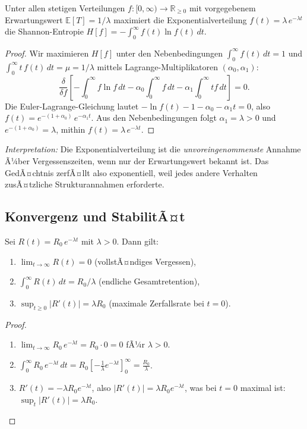 ﻿\documentclass[12pt,a4paper,twoside]{article}
\theoremstyle{theormstyle}
\theoremstyle{proofstyle}
\begin{document}
		Unter allen stetigen Verteilungen $f : [0,\infty) \to \mathbb{R}_{\geq 0}$
		mit vorgegebenem Erwartungswert $\mathbb{E}[T] = 1/\lambda$ maximiert die
		Exponentialverteilung
		$f(t) = \lambda\,e^{-\lambda t}$
		die Shannon-Entropie
		$H[f] = -\int_0^\infty f(t)\ln f(t)\,dt$.
	
	\begin{proof}
		Wir maximieren $H[f]$ unter den Nebenbedingungen
		$\int_0^\infty f(t)\,dt = 1$ und $\int_0^\infty t\,f(t)\,dt = \mu = 1/\lambda$
		mittels Lagrange-Multiplikatoren $(\alpha_0, \alpha_1)$:
		\[
		\frac{\delta}{\delta f}\!\left[
		-\!\int_0^\infty f\ln f\,dt
		- \alpha_0\!\int_0^\infty f\,dt
		- \alpha_1\!\int_0^\infty t f\,dt
		\right] = 0.
		\]
		Die Euler-Lagrange-Gleichung lautet
		$-\ln f(t) - 1 - \alpha_0 - \alpha_1 t = 0$, also
		$f(t) = e^{-(1+\alpha_0)}\,e^{-\alpha_1 t}$.
		Aus den Nebenbedingungen folgt $\alpha_1 = \lambda > 0$ und
		$e^{-(1+\alpha_0)} = \lambda$, mithin $f(t) = \lambda\,e^{-\lambda t}$.
	\end{proof}
	
	\textit{Interpretation:} Die Exponentialverteilung ist die \emph{unvoreingenommenste}
	Annahme Ã¼ber Vergessenszeiten, wenn nur der Erwartungswert bekannt ist.
	Das GedÃ¤chtnis zerfÃ¤llt also exponentiell, weil jedes andere Verhalten
	zusÃ¤tzliche Strukturannahmen erforderte.
	
	\subsection{Konvergenz und StabilitÃ¤t}
	
		Sei $R(t) = R_0\,e^{-\lambda t}$ mit $\lambda > 0$. Dann gilt:
		\begin{enumerate}[label=(\roman*)]
			\item $\lim_{t\to\infty} R(t) = 0$ (vollstÃ¤ndiges Vergessen),
			\item $\int_0^\infty R(t)\,dt = R_0/\lambda$ (endliche Gesamtretention),
			\item $\sup_{t \geq 0} |R'(t)| = \lambda R_0$ (maximale Zerfallsrate bei $t=0$).
		\end{enumerate}
	
	\begin{proof}
		\begin{enumerate}[label=(\roman*)]
			\item $\lim_{t\to\infty} R_0\,e^{-\lambda t} = R_0 \cdot 0 = 0$
			fÃ¼r $\lambda > 0$. \hfill
			\item $\int_0^\infty R_0\,e^{-\lambda t}\,dt
			= R_0\left[-\frac{1}{\lambda}e^{-\lambda t}\right]_0^\infty
			= \frac{R_0}{\lambda}$. \hfill
			\item $R'(t) = -\lambda R_0 e^{-\lambda t}$, also $|R'(t)| = \lambda R_0 e^{-\lambda t}$,
			was bei $t=0$ maximal ist: $\sup_t |R'(t)| = \lambda R_0$. \hfill
		\end{enumerate}
	\end{proof}
	
\end{document}
